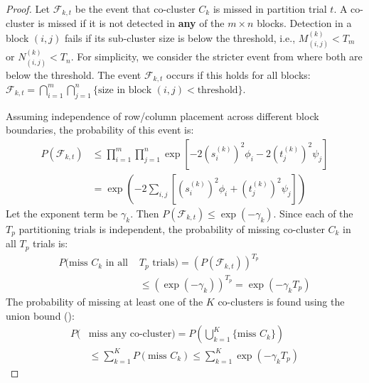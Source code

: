 \documentclass[journal]{IEEEtran}
\theoremstyle{definition}
\theoremstyle{remark} %
\begin{document}
{\color{blue}
\begin{proof}
    Let $\mathcal{F}_{k,t}$ be the event that co-cluster $C_k$ is missed in partition trial $t$. A co-cluster is missed if it is not detected in \textbf{any} of the $m \times n$ blocks. Detection in a block $(i,j)$ fails if its sub-cluster size is below the threshold, i.e., $M_{(i,j)}^{(k)} < T_m$ or $N_{(i,j)}^{(k)} < T_n$. For simplicity, we consider the stricter event from  where both are below the threshold. The event $\mathcal{F}_{k,t}$ occurs if this holds for all blocks: $\mathcal{F}_{k,t} = \bigcap_{i=1}^m \bigcap_{j=1}^n \{\text{size in block }(i,j) < \text{threshold}\}$.

    Assuming independence of row/column placement across different block boundaries, the probability of this event is:
    \begin{equation}
        \begin{aligned}
            P(\mathcal{F}_{k,t}) &\le \prod_{i=1}^m \prod_{j=1}^n \exp\left[-2 (s_i^{(k)})^2 \phi_i -2 (t_j^{(k)})^2 \psi_j\right] \\
            &= \exp\left( -2 \sum_{i,j} \left[ (s_i^{(k)})^2 \phi_i + (t_j^{(k)})^2 \psi_j \right] \right)
        \end{aligned}
    \end{equation}
    Let the exponent term be $\gamma_k$. Then $P(\mathcal{F}_{k,t}) \le \exp(-\gamma_k)$. Since each of the $T_p$ partitioning trials is independent, the probability of missing co-cluster $C_k$ in all $T_p$ trials is:
    \begin{equation}
        \begin{aligned}
            P(\text{miss } C_k \text{ in all } & T_p \text{ trials}) = (P(\mathcal{F}_{k,t}))^{T_p} \\
            &\le (\exp(-\gamma_k))^{T_p} = \exp(-\gamma_k T_p)
        \end{aligned}
    \end{equation}
    The probability of missing at least one of the $K$ co-clusters is found using the union bound ():
    \begin{equation}
        \begin{aligned}
            P(&\text{miss any co-cluster}) = P\left(\bigcup_{k=1}^K \{\text{miss } C_k\}\right) \\
            &\le \sum_{k=1}^K P(\text{miss } C_k) \le \sum_{k=1}^K \exp(-\gamma_k T_p)
        \end{aligned}
    \end{equation}

\end{proof}}
\end{document}
